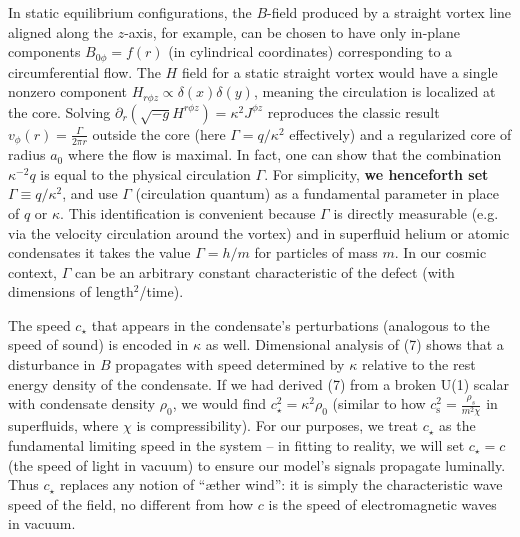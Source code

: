 \documentclass[12pt]{article}
\begin{document}
In static equilibrium configurations, the $B$-field produced by a straight vortex line aligned along the $z$-axis, for example, can be chosen to have only in-plane components $B_{0\phi}= f(r)$ (in cylindrical coordinates) corresponding to a circumferential flow. The $H$ field for a static straight vortex would have a single nonzero component $H_{r\phi z} \propto \delta(x)\delta(y)$, meaning the circulation is localized at the core. Solving $\partial_r(\sqrt{-g} H^{r\phi z}) = \kappa^2 J^{\phi z}$ reproduces the classic result $v_\phi(r) = \frac{\Gamma}{2\pi r}$ outside the core (here $\Gamma = q/\kappa^2$ effectively) and a regularized core of radius $a_0$ where the flow is maximal. In fact, one can show that the combination $\kappa^{-2} q$ is equal to the physical circulation $\Gamma$. For simplicity, \textbf{we henceforth set $\Gamma \equiv q/\kappa^2$}, and use $\Gamma$ (circulation quantum) as a fundamental parameter in place of $q$ or $\kappa$. This identification is convenient because $\Gamma$ is directly measurable (e.g. via the velocity circulation around the vortex) and in superfluid helium or atomic condensates it takes the value $\Gamma = h/m$ for particles of mass $m$. In our cosmic context, $\Gamma$ can be an arbitrary constant characteristic of the defect (with dimensions of length${}^2$/time).

The speed $c_\star$ that appears in the condensate’s perturbations (analogous to the speed of sound) is encoded in $\kappa$ as well. Dimensional analysis of (7) shows that a disturbance in $B$ propagates with speed determined by $\kappa$ relative to the rest energy density of the condensate. If we had derived (7) from a broken U(1) scalar with condensate density $\rho_0$, we would find $c_\star^2 = \kappa^2 \rho_0$ (similar to how $c_{\text{s}}^2 = \frac{\rho_s}{m^2\chi}$ in superfluids, where $\chi$ is compressibility). For our purposes, we treat $c_\star$ as the fundamental limiting speed in the system – in fitting to reality, we will set $c_\star = c$ (the speed of light in vacuum) to ensure our model’s signals propagate luminally. Thus $c_\star$ replaces any notion of “æther wind”: it is simply the characteristic wave speed of the field, no different from how $c$ is the speed of electromagnetic waves in vacuum.
\end{document}
